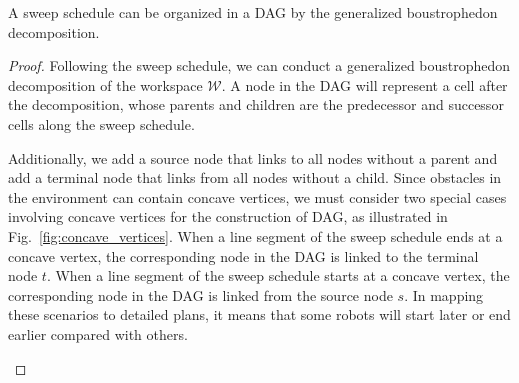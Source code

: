 \begin{theorem}
A sweep schedule can be organized in a DAG by the generalized boustrophedon decomposition.
\end{theorem}

\begin{proof}
Following the sweep schedule, we can conduct a generalized boustrophedon 
decomposition of the workspace $\mathcal W$. 
%
A node in the DAG will represent a cell after the decomposition, whose 
parents and children are the predecessor and successor cells along the 
sweep schedule. 

Additionally, we add a source node that links to all nodes without a parent 
and add a terminal node that links from all nodes without a child.
%
Since obstacles in the environment can contain concave vertices, we must 
consider two special cases involving concave vertices for the construction of DAG, 
as illustrated in Fig.~\ref{fig:concave_vertices}. 
%
When a line segment of the sweep schedule ends at a concave vertex, 
the corresponding node in the DAG is linked to the terminal node $t$.
When a line segment of the sweep schedule starts at a concave vertex,
the corresponding node in the DAG is linked from the source node $s$.
In mapping these scenarios to detailed plans, it means that 
some robots will start later or end earlier compared with 
others.

\begin{figure} [ht]
    \centering
\end{figure}
\end{proof}
